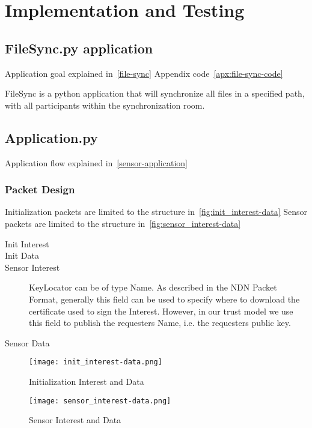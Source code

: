 \chapter{Implementation and Testing}

\section{FileSync.py application}
Application goal explained in~\autoref{file-sync}
Appendix code~\autoref{apx:file-sync-code}

FileSync is a python application that will synchronize all files in a specified path, with all participants within the synchronization room.

\section{Application.py}
Application flow explained in~\autoref{sensor-application}

\subsection{Packet Design}
Initialization packets are limited to the structure in~\autoref{fig:init_interest-data}
Sensor packets are limited to the structure in~\autoref{fig:sensor_interest-data}
\begin{description}
	\item[Init Interest]
	\item[Init Data]
	\item[Sensor Interest]
	KeyLocator can be of type Name. 
	As described in the \gls{NDN} Packet Format, generally this field can be used to specify where to download the certificate used to sign the Interest.
	However, in our trust model we use this field to publish the requesters Name, i.e. the requesters public key. 
	\item[Sensor Data]
\end{description}

\begin{figure}[ht]
  \centering
  \texttt{[image: init\_interest-data.png]}
  \caption{Initialization Interest and Data}
  \label{fig:init_interest-data}
\end{figure}

\begin{figure}[ht]
  \centering
  \texttt{[image: sensor\_interest-data.png]}
  \caption{Sensor Interest and Data}
  \label{fig:sensor_interest-data}
\end{figure}